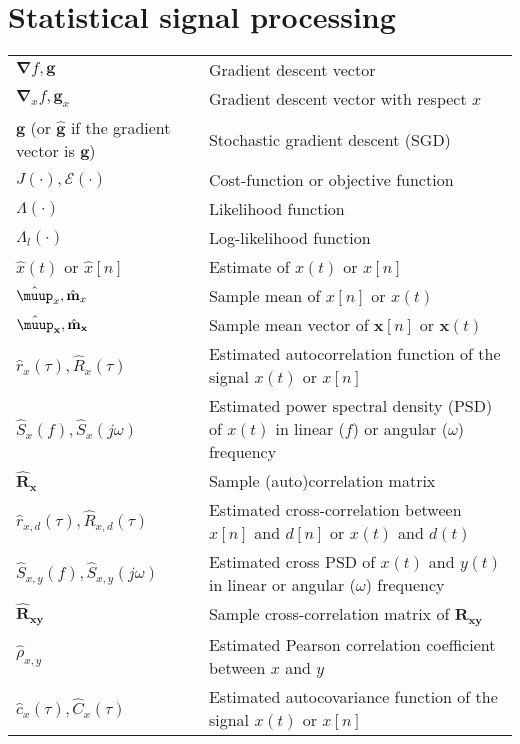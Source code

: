 \documentclass{article}
\begin{document}
\section{Statistical signal processing}
\begin{xltabular}{\textwidth}{XX}
    \(\boldsymbol{\nabla}f, \mathbf{g}\) & Gradient descent vector \\
    \(\boldsymbol{\nabla}_{x}f, \mathbf{g}_{x}\) & Gradient descent vector with respect \(x\)\\
    \(\mathbf{g}\) (or \(\hat{\mathbf{g}}\) if the gradient vector is \(\mathbf{g}\)) & Stochastic gradient descent (SGD) \\
    \(J(\cdot), \mathcal{E}(\cdot)\) & Cost-function or objective function\\
    \(\Lambda(\cdot)\) & Likelihood function\\
    \(\Lambda_l(\cdot)\) & Log-likelihood function\\
    \(\hat{x}(t)\) or \(\hat{x}[n]\) & Estimate of \(x(t)\) or \(x[n]\)\\
    \(\hat{\boldsymbol{\muup}}_x, \hat{\mathbf{m}}_x\) & Sample mean of \(x[n]\) or \(x(t)\) \\
    \(\hat{\boldsymbol{\muup}}_\mathbf{x}, \hat{\mathbf{m}}_\mathbf{x}\) & Sample mean vector of \(\mathbf{x}[n]\) or \(\mathbf{x}(t)\)\\
    \(\hat{r}_x(\tau), \hat{R}_x(\tau)\) & Estimated autocorrelation function of the signal \(x(t)\) or \(x[n]\)\\
    \(\hat{S}_x(f), \hat{S}_x(j\omega)\) & Estimated power spectral density (PSD) of \(x(t)\) in linear (\(f\)) or angular (\(\omega\)) frequency\\
    \(\hat{\mathbf{R}}_\mathbf{x}\) & Sample (auto)correlation matrix \\
    \(\hat{r}_{x,d}(\tau), \hat{R}_{x,d}(\tau)\) & Estimated cross-correlation between \(x[n]\) and \(d[n]\) or \(x(t)\) and \(d(t)\)\\
    \(\hat{S}_{x,y}(f), \hat{S}_{x,y}(j\omega)\) & Estimated cross PSD of \(x(t)\) and \(y(t)\) in linear or angular (\(\omega\)) frequency\\
    \(\hat{\mathbf{R}}_\mathbf{xy}\) & Sample cross-correlation matrix of \(\mathbf{R}_\mathbf{xy}\) \\
    \(\hat{\rho}_{x,y}\) & Estimated Pearson correlation coefficient between \(x\) and \(y\)\\
    \(\hat{c}_x(\tau), \hat{C}_x(\tau)\) & Estimated autocovariance function of the signal \(x(t)\) or \(x[n]\)\\

\end{xltabular}
\end{document}
